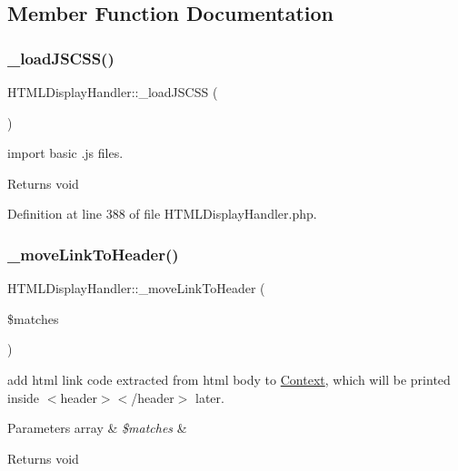 \subsection{Member Function Documentation}
\hypertarget{classHTMLDisplayHandler_a061f7f11230af884eb1784a2d495fbfd}{}\label{classHTMLDisplayHandler_a061f7f11230af884eb1784a2d495fbfd} 
\subsubsection{\texorpdfstring{\+\_\+load\+J\+S\+C\+S\+S()}{\_loadJSCSS()}}
{\footnotesize\ttfamily H\+T\+M\+L\+Display\+Handler\+::\+\_\+load\+J\+S\+C\+SS (\begin{DoxyParamCaption}{ }\end{DoxyParamCaption})}

import basic .js files. \begin{DoxyReturn}{Returns}
void 
\end{DoxyReturn}


Definition at line 388 of file H\+T\+M\+L\+Display\+Handler.\+php.

\hypertarget{classHTMLDisplayHandler_a6ea4cd64e8099e5ded248ec376772913}{}\label{classHTMLDisplayHandler_a6ea4cd64e8099e5ded248ec376772913} 
\subsubsection{\texorpdfstring{\+\_\+move\+Link\+To\+Header()}{\_moveLinkToHeader()}}
{\footnotesize\ttfamily H\+T\+M\+L\+Display\+Handler\+::\+\_\+move\+Link\+To\+Header (\begin{DoxyParamCaption}\item[{}]{\$matches }\end{DoxyParamCaption})}

add html link code extracted from html body to \hyperlink{classContext}{Context}, which will be printed inside $<$header$>$$<$/header$>$ later. 
\begin{DoxyParams}[1]{Parameters}
array & {\em \$matches} & \\
\hline
\end{DoxyParams}
\begin{DoxyReturn}{Returns}
void 
\end{DoxyReturn}


